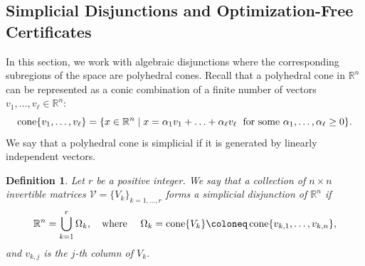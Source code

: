 \documentclass[12pt]{article}
\newcommand{\reals}{\mathbb{R}}
\newcommand{\defeq}{\coloneq}
\newcommand{\cone}{\operatornamewithlimits{cone}}
\newcommand{\mcD}{\mathcal{D}}
\newcommand{\mcV}{\mathcal{V}}
\newtheorem{definition}{Definition}%
\theoremstyle{remark}
\begin{document}
\subsection{Simplicial Disjunctions and Optimization-Free Certificates}
In this section, we work with algebraic disjunctions where the corresponding subregions of the space are polyhedral cones. 
Recall that a polyhedral cone in $\reals^n$ can be represented as a conic combination of a finite number of vectors $v_1,\ldots,v_{\ell}\in\reals^n$: 
\[\cone\{v_1,\ldots,v_{\ell}\}=\{x\in\reals^n\mid x=\alpha_1v_1+\ldots+\alpha_{\ell}v_{\ell}\;\text{ for some }\alpha_1,\ldots,\alpha_{\ell}\ge 0\}.\]
We say that a polyhedral cone is simplicial if it is generated by linearly independent vectors.

\begin{definition}
Let $r$ be a positive integer. We say that a collection of $n\times n$ invertible matrices $\mcV=\{V_k\}_{k=1,\ldots,r}$ forms a \emph{simplicial disjunction} of $\reals^n$ if 
\[\mathbb{R}^n=\bigcup\limits_{k=1}^r\Omega_k,\quad \text{where }\quad\Omega_k=\cone\{V_k\}\defeq\cone\{v_{k,1}, \ldots, v_{k,n}\},\]
and $v_{k,j}$ is the $j$-th column of $V_k$.
\end{definition}
\end{document}
